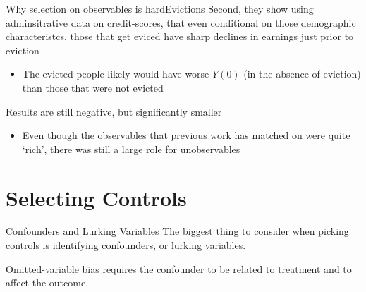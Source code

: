 \documentclass[aspectratio=169,t,11pt,table]{beamer}
\begin{document}
\begin{frame}{Why selection on observables is hard}{Evictions}
  Second, they show using adminsitrative data on credit-scores, that even conditional on those demographic characteristcs, those that get eviced have sharp declines in earnings just prior to eviction
  \begin{itemize}
    \item The evicted people likely would have worse $Y(0)$ (in the absence of eviction) than those that were not evicted
  \end{itemize}

  \pause
  \bigskip
  Results are still negative, but significantly smaller
  \begin{itemize}
    \item Even though the observables that previous work has matched on were quite `rich', there was still a large role for unobservables
  \end{itemize}
\end{frame}


\section{Selecting Controls}

\begin{frame}{Confounders and Lurking Variables}
  The biggest thing to consider when picking controls is identifying \alert{confounders}, or \alert{lurking variables}.

  \bigskip
  Omitted-variable bias requires the confounder to be related to treatment and to affect the outcome.

  \bigskip
  \begin{center}

  \end{center}
\end{frame}
\end{document}
